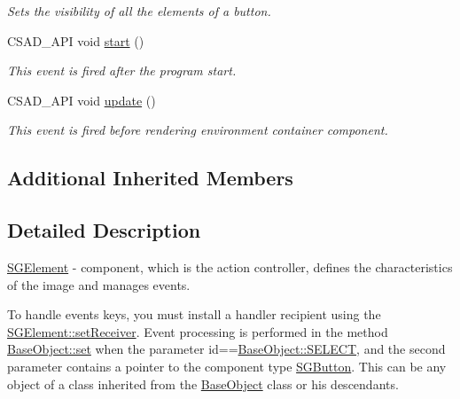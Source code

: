 \begin{DoxyCompactItemize}
\begin{DoxyCompactList}\small\item\em Sets the visibility of all the elements of a button. \end{DoxyCompactList}\item 
\hypertarget{classcsad_1_1_s_g_element_a04be5d7b54d66719776f518c6eb043aa}{C\-S\-A\-D\-\_\-\-A\-P\-I void \hyperlink{classcsad_1_1_s_g_element_a04be5d7b54d66719776f518c6eb043aa}{start} ()}\label{classcsad_1_1_s_g_element_a04be5d7b54d66719776f518c6eb043aa}

\begin{DoxyCompactList}\small\item\em This event is fired after the program start. \end{DoxyCompactList}\item 
\hypertarget{classcsad_1_1_s_g_element_a8e45f4cb6e90396b30bfb58497b5a4cd}{C\-S\-A\-D\-\_\-\-A\-P\-I void \hyperlink{classcsad_1_1_s_g_element_a8e45f4cb6e90396b30bfb58497b5a4cd}{update} ()}\label{classcsad_1_1_s_g_element_a8e45f4cb6e90396b30bfb58497b5a4cd}

\begin{DoxyCompactList}\small\item\em This event is fired before rendering environment container component. \end{DoxyCompactList}\end{DoxyCompactItemize}
\subsection*{Additional Inherited Members}


\subsection{Detailed Description}
\hyperlink{classcsad_1_1_s_g_element}{S\-G\-Element} -\/ component, which is the action controller, defines the characteristics of the image and manages events. 

To handle events keys, you must install a handler recipient using the \hyperlink{classcsad_1_1_s_g_element_a1a8aaf98a4fb6960e00365000b44bff9}{S\-G\-Element\-::set\-Receiver}. Event processing is performed in the method \hyperlink{classcsad_1_1_base_object_aa8d3a855874527b14a5c56f629789b1f}{Base\-Object\-::set} when the parameter id==\hyperlink{classcsad_1_1_base_object_a27d9db492c1a385aa4086da1824e2737a1ad754d1312e455b8585419a33bba1bf}{Base\-Object\-::\-S\-E\-L\-E\-C\-T}, and the second parameter contains a pointer to the component type \hyperlink{classcsad_1_1_s_g_button}{S\-G\-Button}. This can be any object of a class inherited from the \hyperlink{classcsad_1_1_base_object}{Base\-Object} class or his descendants.

